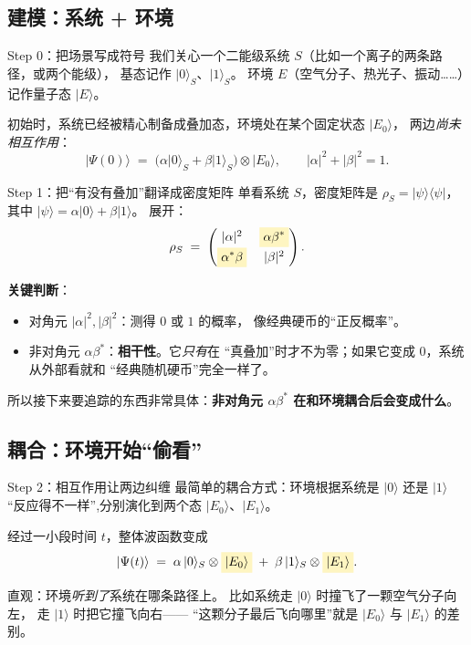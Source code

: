 \documentclass[11pt,a4paper]{ctexart}
\newcommand{\hl}[1]{\colorbox{Goldenrod!28}{$\displaystyle #1$}}
\begin{document}
\subsection{建模：系统 + 环境}

\begin{stepblock}{Step 0：把场景写成符号}
我们关心一个二能级系统 $S$（比如一个离子的两条路径，或两个能级），
基态记作 $\lvert 0\rangle_S$、$\lvert 1\rangle_S$。
环境 $E$（空气分子、热光子、振动……）记作量子态 $\lvert E\rangle$。
\smallskip

初始时，系统已经被精心制备成叠加态，环境处在某个固定状态 $\lvert E_0\rangle$，
两边\emph{尚未相互作用}：
\[
  \lvert\Psi(0)\rangle
  \;=\;
  \bigl(\alpha\lvert 0\rangle_S + \beta\lvert 1\rangle_S\bigr)
  \otimes
  \lvert E_0\rangle,
  \qquad |\alpha|^2 + |\beta|^2 = 1.
\]
\end{stepblock}

\begin{stepblock}{Step 1：把``有没有叠加''翻译成密度矩阵}
单看系统 $S$，密度矩阵是 $\rho_S = \lvert\psi\rangle\langle\psi\rvert$，
其中 $\lvert\psi\rangle = \alpha\lvert 0\rangle + \beta\lvert 1\rangle$。
展开：
\[
  \rho_S
  \;=\;
  \begin{pmatrix}
    |\alpha|^2 & \hl{\alpha\beta^{*}} \\[2pt]
    \hl{\alpha^{*}\beta} & |\beta|^2
  \end{pmatrix}.
\]

\textbf{关键判断}：
\begin{itemize}
  \item 对角元 $|\alpha|^2,|\beta|^2$：测得 $0$ 或 $1$ 的概率，
        像经典硬币的``正反概率''。
  \item 非对角元 $\alpha\beta^{*}$：\textbf{相干性}。它\emph{只有}在
        ``真叠加''时才不为零；如果它变成 $0$，系统从外部看就和
        ``经典随机硬币''完全一样了。
\end{itemize}

所以接下来要追踪的东西非常具体：\textbf{非对角元 $\alpha\beta^{*}$
在和环境耦合后会变成什么}。
\end{stepblock}

\subsection{耦合：环境开始``偷看''}

\begin{stepblock}{Step 2：相互作用让两边纠缠}
最简单的耦合方式：环境根据系统是 $\lvert 0\rangle$ 还是 $\lvert 1\rangle$
``反应得不一样'',分别演化到两个态 $\lvert E_0\rangle$、$\lvert E_1\rangle$。
\smallskip

经过一小段时间 $t$，整体波函数变成
\[
  \lvert\Psi(t)\rangle
  \;=\;
  \alpha\,\lvert 0\rangle_S\otimes \hl{\lvert E_0\rangle}
  \;+\;
  \beta\,\lvert 1\rangle_S\otimes \hl{\lvert E_1\rangle}.
\]

直观：环境\emph{听到了}系统在哪条路径上。
比如系统走 $\lvert 0\rangle$ 时撞飞了一颗空气分子向左，
走 $\lvert 1\rangle$ 时把它撞飞向右——
``这颗分子最后飞向哪里''就是 $\lvert E_0\rangle$ 与 $\lvert E_1\rangle$ 的差别。
\end{stepblock}
\end{document}

